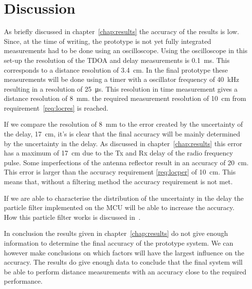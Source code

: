 \chapter{Discussion}

As briefly discussed in chapter~\ref{chap:results} the accuracy of the results is low.
Since, at the time of writing, the prototype is not yet fully integrated measurements had to be done using an oscilloscope.
Using the oscilloscope in this set-up the resolution of the TDOA and delay measurements is \SI{0.1}{\milli\second}.
This corresponds to a distance resolution of \SI{3.4}{\centi\meter}.
In the final prototype these measurements will be done using a timer with a oscillator frequency of \SI{40}{\kilo\hertz} resulting in a resolution of \SI{25}{\micro\second}.
This resolution in time measurement gives a distance resolution of \SI{8}{\milli\meter}.
the required measurement resolution of \SI{10}{\centi\meter} from requirement~\ref{req:locres} is reached.

If we compare the resolution of \SI{8}{\milli\meter} to the error created by the uncertainty of the delay, \SI{17}{\centi\meter}, it's is clear that the final accuracy will be mainly determined by the uncertainty in the delay.
As discussed in chapter~\ref{chap:results} this error has a maximum of \SI{17}{\centi\meter} due to the Tx and Rx delay of the radio frequency pulse. Some imperfections of the antenna reflector result in an accuracy of \SI{20}{\centi\meter}.
This error is larger than the accuracy requirement \ref{req:locper} of \SI{10}{\centi\meter}.
This means that, without a filtering method the accuracy requirement is not met.

If we are able to characterise the distribution of the uncertainty in the delay the particle filter implemented on the MCU will be able to increase the accuracy.
How this particle filter works is discussed in~\cite{processing}.

In conclusion the results given in chapter~\ref{chap:results} do not give enough information to determine the final accuracy of the prototype system.
We can however make conclusions on which factors will have the largest influence on the accuracy.
The results do give enough data to conclude that the final system will be able to perform distance measurements with an accuracy close to the required performance.

